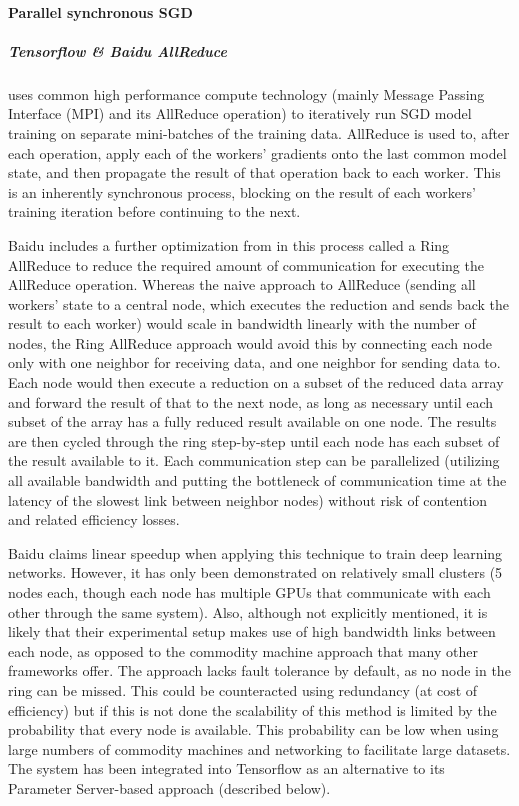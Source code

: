 \paragraph{Parallel synchronous SGD}


\subparagraph{Tensorflow \& Baidu AllReduce \citep{BaiduAllReduce2017}}

uses common high performance compute technology (mainly Message Passing Interface (MPI) and its AllReduce operation) to iteratively run SGD model training on separate mini-batches of the training data. AllReduce is used to, after each operation, apply each of the workers’ gradients onto the last common model state, and then propagate the result of that operation back to each worker. This is an inherently synchronous process, blocking on the result of each workers’ training iteration before continuing to the next.

Baidu includes a further optimization from \citet{Patarasuk2009} in this process called a Ring AllReduce to reduce the required amount of communication for executing the AllReduce operation. Whereas the naive approach to AllReduce (sending all workers’ state to a central node, which executes the reduction and sends back the result to each worker) would scale in bandwidth linearly with the number of nodes, the Ring AllReduce approach would avoid this by connecting each node only with one neighbor for receiving data, and one neighbor for sending data to. Each node would then execute a reduction on a subset of the reduced data array and forward the result of that to the next node, as long as necessary until each subset of the array has a fully reduced result available on one node. The results are then cycled through the ring step-by-step until each node has each subset of the result available to it. Each communication step can be parallelized (utilizing all available bandwidth and putting the bottleneck of communication time at the latency of the slowest link between neighbor nodes) without risk of contention and related efficiency losses.

Baidu claims linear speedup when applying this technique to train deep learning networks. However, it has only been demonstrated on relatively small clusters (5 nodes each, though each node has multiple GPUs that communicate with each other through the same system). Also, although not explicitly mentioned, it is likely that their experimental setup makes use of high bandwidth links between each node, as opposed to the commodity machine approach that many other frameworks offer. The approach lacks fault tolerance by default, as no node in the ring can be missed. This could be counteracted using redundancy (at cost of efficiency) but if this is not done the scalability of this method is limited by the probability that every node is available. This probability can be low when using large numbers of commodity machines and networking to facilitate large datasets.\\
The system has been integrated into Tensorflow as an alternative to its Parameter Server-based approach (described below).

